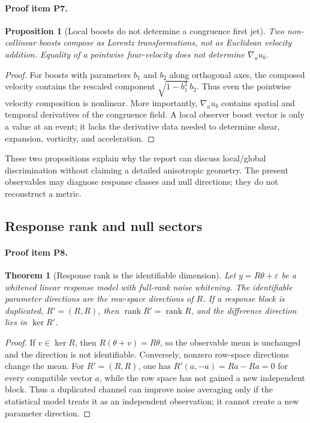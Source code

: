 \documentclass[11pt]{article}
\newcommand{\rank}{\operatorname{rank}}
\newtheorem{proposition}{Proposition}
\newtheorem{theorem}{Theorem}
\begin{document}
\paragraph{Proof item P7.}
\begin{proposition}[Local boosts do not determine a congruence first jet]
Two non-collinear boosts compose as Lorentz transformations, not as Euclidean velocity addition.  Equality of a pointwise four-velocity does not determine \(\nabla_a u_b\).
\end{proposition}
\begin{proof}
For boosts with parameters \(b_1\) and \(b_2\) along orthogonal axes, the composed velocity contains the rescaled component \(\sqrt{1-b_1^2}\,b_2\).  Thus even the pointwise velocity composition is nonlinear.  More importantly, \(\nabla_a u_b\) contains spatial and temporal derivatives of the congruence field.  A local observer boost vector is only a value at an event; it lacks the derivative data needed to determine shear, expansion, vorticity, and acceleration.
\end{proof}

These two propositions explain why the report can discuss local/global discrimination without claiming a detailed anisotropic geometry.  The present observables may diagnose response classes and null directions; they do not reconstruct a metric.

\subsection{Response rank and null sectors}
\paragraph{Proof item P8.}
\begin{theorem}[Response rank is the identifiable dimension]
Let \(y=R\theta+\varepsilon\) be a whitened linear response model with full-rank noise whitening.  The identifiable parameter directions are the row-space directions of \(R\).  If a response block is duplicated, \(R'=(R,R)\), then \(\rank R'=\rank R\), and the difference direction lies in \(\ker R'\).
\end{theorem}
\begin{proof}
If \(v\in\ker R\), then \(R(\theta+v)=R\theta\), so the observable mean is unchanged and the direction is not identifiable.  Conversely, nonzero row-space directions change the mean.  For \(R'=(R,R)\), one has \(R'(a,-a)=Ra-Ra=0\) for every compatible vector \(a\), while the row space has not gained a new independent block.  Thus a duplicated channel can improve noise averaging only if the statistical model treats it as an independent observation; it cannot create a new parameter direction.
\end{proof}
\end{document}
